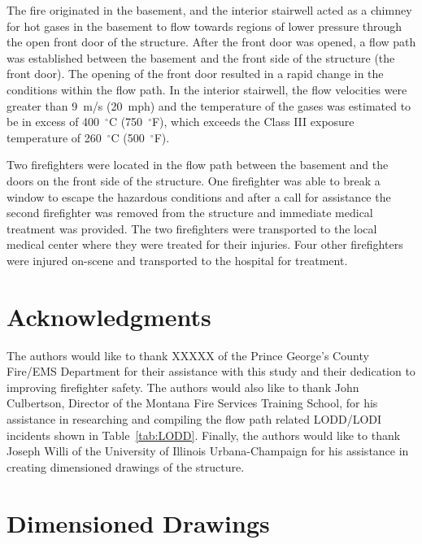 \documentclass[12pt,oneside]{book}
\begin{document}
The fire originated in the basement, and the interior stairwell acted as a chimney for hot gases in the basement to flow towards regions of lower pressure through the open front door of the structure. After the front door was opened, a flow path was established between the basement and the front side of the structure (the front door). The opening of the front door resulted in a rapid change in the conditions within the flow path. In the interior stairwell, the flow velocities were greater than 9~m/s (20~mph) and the temperature of the gases was estimated to be in excess of 400~$^{\circ}$C (750~$^{\circ}$F), which exceeds the Class III exposure temperature of 260~$^{\circ}$C (500~$^{\circ}$F).

Two firefighters were located in the flow path between the basement and the doors on the front side of the structure. One firefighter was able to break a window to escape the hazardous conditions and after a call for assistance the second firefighter was removed from the structure and immediate medical treatment was provided. The two firefighters were transported to the local medical center where they were treated for their injuries. Four other firefighters were injured on-scene and transported to the hospital for treatment.

\chapter{Acknowledgments}

The authors would like to thank XXXXX of the Prince George's County Fire/EMS Department for their assistance with this study and their dedication to improving firefighter safety. The authors would also like to thank John Culbertson, Director of the Montana Fire Services Training School, for his assistance in researching and compiling the flow path related LODD/LODI incidents shown in Table~\ref{tab:LODD}. Finally, the authors would like to thank Joseph Willi of the University of Illinois Urbana-Champaign for his assistance in creating dimensioned drawings of the structure.




\appendix

\chapter{Dimensioned Drawings}
\label{app_draw}
\end{document}
